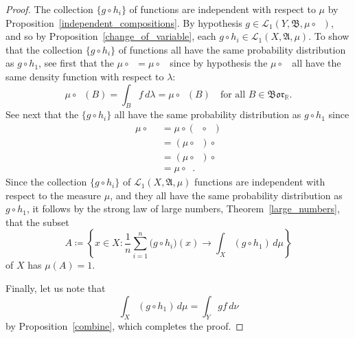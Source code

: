 \documentclass[
twoside=true,
paper=letter,
fontsize=9pt,
pagesize=auto,
leqno,
openany,
headsepline,
overfullrule,
]{scrbook}
\theoremstyle{plain}
\theoremstyle{plain}
\theoremstyle{definition}
\theoremstyle{bfnoteitalic}
\theoremstyle{bfnoteroman}
\newcommand{\sigalg}[1]{\mathfrak{#1}}
\newcommand{\cali}[1]{\mathscr{#1}}
\newcommand{\definedby}{\coloneqq}
\newcommand{\borel}{\mathfrak{Bor}}
\newcommand{\preimage}[1]{\mathop{#1^{\leftarrow}}}
\newcommand{\R}{\mathbb{R}}
\newcommand{\sigmaalgebra}{\sigalg{A}}
\newcommand{\sigmaalgebraii}{\sigalg{B}}
\newcommand{\funcf}{f}
\newcommand{\funcg}{g}
\newcommand{\funch}{h}
\newcommand{\function}{f}
\newcommand{\functionii}{g}
\newcommand{\functioniii}{h}
\newcommand{\measurespace}{X}
\newcommand{\measurespaceii}{Y}
\newcommand{\mspaceelt}{x}
\newcommand{\measure}{\mu}
\newcommand{\measmu}{\mu}
\newcommand{\measnu}{\nu}
\newcommand{\measureiii}{\lambda}
\newcommand{\seti}{A}
\newcommand{\setii}{B}
\begin{document}
\begin{proof}
The collection 
$\{
\funcg\circ\funch_i
\}$
of functions are independent with respect to $\measmu$
by Proposition~\ref{independent_compositions}.
By hypothesis
$\funcg\in
\cali{L}_1(\measurespaceii,\sigmaalgebraii,\measmu\circ\preimage{\funch_i})$,
and so by Proposition~\ref{change_of_variable}, each
$\funcg\circ\funch_i
\in
\cali{L}_1(\measurespace, \sigmaalgebra, \measmu)$.
To show that the collection 
$\{
\functionii\circ\functioniii_i
\}$
of functions all have the same probability distribution as $\functionii\circ\functioniii_1$, 
see first that the 
$\measure\circ \preimage{\functioniii_i} = \measure\circ\preimage{\functioniii_1}$ since by hypothesis the 
$\measure\circ \preimage{\functioniii_i}$ all have the same density function with respect to 
$\measureiii$:
\[
\measure\circ \preimage{\functioniii_i} (\setii) 
=
\int_\setii \function\, d\measureiii
=
\measure\circ \preimage{\functioniii_1} (\setii) 
\quad\text{for all $\setii\in\borel_\R$.}
\]
See next that the $\{
\functionii\circ\functioniii_i
\}$
all have the same probability distribution as $\funcg\circ\funch_1$ since
\begin{align*}
\measure\circ \preimage{(\functionii \circ\functioniii_i)}
& = \measure\circ(\preimage{\functioniii_i}\circ\preimage{\functionii}) \\
& = (\measure\circ\preimage{\functioniii_i})\circ\preimage{\functionii} \\
& = (\measure\circ\preimage{\functioniii_1})\circ\preimage{\functionii} \\
& = \measure\circ \preimage{(\functionii \circ\functioniii_1)}.
\end{align*}
Since the collection 
$\{
\functionii\circ\functioniii_i
\}$
of
$\cali{L}_1(\measurespace, \sigmaalgebra, \measure)$
functions are independent with respect to the measure $\measure$, and they all have the same probability distribution as
$\functionii\circ\functioniii_1$, it follows by the strong law of large numbers, Theorem~\ref{large_numbers}, that the subset 
\[
\seti\definedby
\left\{ 
\mspaceelt\in\measurespace : 
\frac{1}{n} \sum_{i=1}^n \bigl( \functionii\circ \functioniii_i \bigr) (x) \to
\int_\measurespace (\functionii \circ \functioniii_1) \,d\measure 
\right\}
\]
of $\measurespace$ has $\measure(\seti)=1$. 


Finally, let us note that
\[
\int_\measurespace (\funcg \circ \funch_1) \, d \measmu
=
\int_\measurespaceii \funcg \funcf \, d\measnu
\]
by Proposition~\ref{combine},
which completes the proof.
\end{proof}
\end{document}
